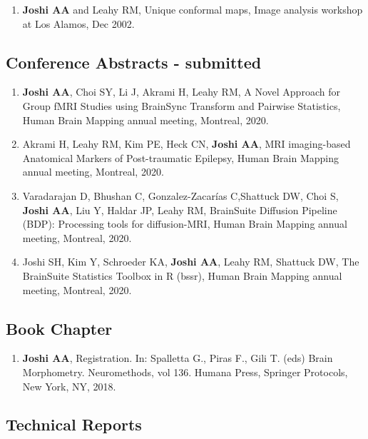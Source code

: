 \documentclass[overlapped,line,letterpaper]{res}
\begin{document}
\begin{resume}
\begin{enumerate}
    \item \textbf{Joshi AA} and Leahy RM, {Unique conformal maps},  Image analysis workshop at Los Alamos, Dec 2002. 
\end{enumerate}

\subsection{Conference Abstracts - submitted}
\begin{enumerate}
    \item \textbf{Joshi AA}, Choi SY, Li J, Akrami H, Leahy RM, {A Novel Approach for Group fMRI Studies using BrainSync Transform and Pairwise Statistics}, Human Brain Mapping annual meeting, Montreal, 2020.
    
    \item Akrami H, Leahy RM, Kim PE, Heck CN, \textbf{Joshi AA}, {MRI imaging-based Anatomical Markers of Post-traumatic Epilepsy}, Human Brain Mapping annual meeting, Montreal, 2020.
    
    \item Varadarajan D, Bhushan C, Gonzalez-Zacarías C,Shattuck DW, Choi S, \textbf{Joshi AA}, Liu Y, Haldar JP, Leahy RM, {BrainSuite Diffusion Pipeline (BDP): Processing tools for diffusion-MRI}, Human Brain Mapping annual meeting, Montreal, 2020.
    
    \item Joshi SH, Kim Y, Schroeder KA, \textbf{Joshi AA}, Leahy RM, Shattuck DW, {The BrainSuite Statistics Toolbox in R (bssr)}, Human Brain Mapping annual meeting, Montreal, 2020.

\end{enumerate}

\subsection{Book Chapter}
\begin{enumerate}
    \item \textbf{Joshi AA},  Registration. In: Spalletta G., Piras F., Gili T. (eds) Brain Morphometry. Neuromethods, vol 136. Humana Press, Springer Protocols, New York, NY, 2018.
\end{enumerate}


\subsection{Technical Reports}
\begin{enumerate}


\end{enumerate}
\end{resume}
\end{document}
